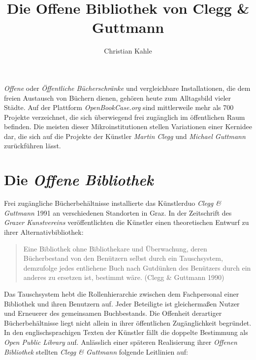\documentclass[a4paper,
fontsize=11pt,
oneside,
numbers=noperiodatend,
parskip=half-,
bibliography=totoc,
final
]{scrartcl}
\title{\LARGE{Die Offene Bibliothek von Clegg \& Guttmann}} %
\author{Christian Kahle} %
\date{}
\begin{document}
\maketitle
\thispagestyle{fancyplain} 


\emph{Offene} oder \emph{Öffentliche Bücherschränke} und vergleichbare
Installationen, die dem freien Austausch von Büchern dienen, gehören
heute zum Alltagsbild vieler Städte. Auf der Plattform
\emph{OpenBookCase.org} sind mittlerweile mehr als 700 Projekte
verzeichnet, die sich überwiegend frei zugänglich im öffentlichen Raum
befinden. Die meisten dieser Mikroinstitutionen stellen Variationen
einer Kernidee dar, die sich auf die Projekte der Künstler \emph{Martin
Clegg} und \emph{Michael Guttmann} zurückführen lässt.

\section*{Die \emph{Offene
Bibliothek}}\label{die-offene-bibliothek}

Frei zugängliche Bücherbehältnisse installierte das Künstlerduo
\emph{Clegg \& Guttmann} 1991 an verschiedenen Standorten in Graz. In
der Zeitschrift des \emph{Grazer Kunstvereins} veröffentlichten die
Künstler einen theoretischen Entwurf zu ihrer Alternativbibliothek:

\begin{quote}
Eine Bibliothek ohne Bibliothekare und Überwachung, deren Bücherbestand
von den Benützern selbst durch ein Tauschsystem, demzufolge jedes
entliehene Buch nach Gutdünken des Benützers durch ein anderes zu
ersetzen ist, bestimmt wäre. (Clegg \& Guttmann 1990)
\end{quote}

Das Tauschsystem hebt die Rollenhierarchie zwischen dem Fachpersonal
einer Bibliothek und ihren Benutzern auf. Jeder Beteiligte ist
gleichermaßen Nutzer und Erneuerer des gemeinsamen Buchbestands. Die
Offenheit derartiger Bücherbehältnisse liegt nicht allein in ihrer
öffentlichen Zugänglichkeit begründet. In den englischsprachigen Texten
der Künstler fällt die doppelte Bestimmung als \emph{Open Public
Library} auf. Anlässlich einer späteren Realisierung ihrer \emph{Offenen
Bibliothek} stellten \emph{Clegg \& Guttmann} folgende Leitlinien auf:
\end{document}
